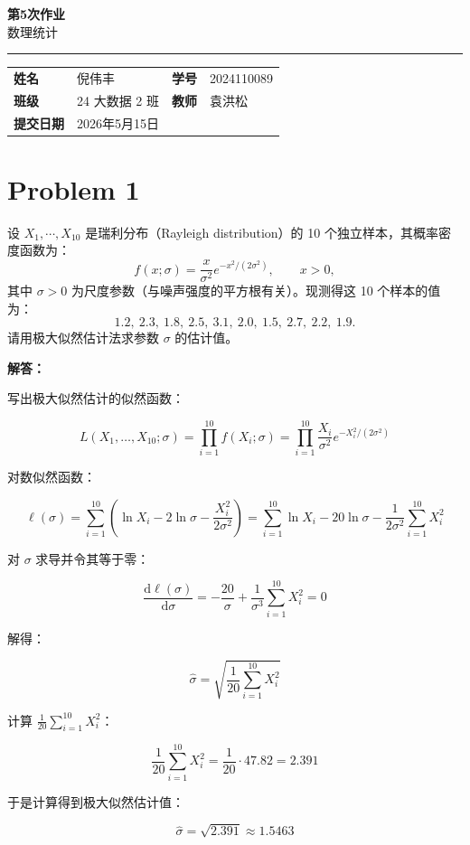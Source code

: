 \documentclass[12pt,a4paper]{article}
\newcommand{\course}{数理统计}
\newcommand{\homeworktitle}{第5次作业}
\newcommand{\studentname}{倪伟丰}
\newcommand{\studentid}{2024110089}
\newcommand{\classname}{24 大数据 2 班}
\newcommand{\teacher}{袁洪松}
\newcommand{\duedate}{2026年5月15日}
\begin{document}
\begin{center}
  {\Huge\bfseries\color{mainblue}\homeworktitle}\\[0.6em]
  {\Large\course}\\[1.2em]
  {\color{linegray}\rule{0.9\textwidth}{0.8pt}}
\end{center}

\begin{infobox}
\begin{tabularx}{\textwidth}{>{\bfseries}p{2.2cm} X >{\bfseries}p{2.2cm} X}
姓名 & \studentname & 学号 & \studentid \\
班级 & \classname & 教师 & \teacher \\
提交日期 & \duedate &  &  \\
\end{tabularx}
\end{infobox}


\section{Problem 1}

设 $X_1,\cdots,X_{10}$ 是瑞利分布（Rayleigh distribution）的 10 个独立样本，其概率密度函数为：
\[
  f(x;\sigma)=\frac{x}{\sigma^2}e^{-x^2/(2\sigma^2)},\qquad x>0,
\]
其中 $\sigma>0$ 为尺度参数（与噪声强度的平方根有关）。现测得这 10 个样本的值为：
\[
  1.2,\ 2.3,\ 1.8,\ 2.5,\ 3.1,\ 2.0,\ 1.5,\ 2.7,\ 2.2,\ 1.9.
\]
请用极大似然估计法求参数 $\sigma$ 的估计值。

\begin{answerbox}
\textbf{解答：}

写出极大似然估计的似然函数：

$$
L(X_1, \ldots, X_{10}; \sigma) = \prod_{i=1}^{10} f(X_i; \sigma) = \prod_{i=1}^{10} \frac{X_i}{\sigma^2} e^{-X_i^2/(2\sigma^2)}
$$

对数似然函数：

$$
\ell(\sigma) = \sum_{i=1}^{10} \left( \ln X_i - 2\ln \sigma - \frac{X_i^2}{2\sigma^2} \right) = \sum_{i=1}^{10} \ln X_i - 20\ln \sigma - \frac{1}{2\sigma^2} \sum_{i=1}^{10} X_i^2
$$

对 $\sigma$ 求导并令其等于零：

$$
\frac{\text{d}\ell(\sigma)}{\text{d}\sigma} = -\frac{20}{\sigma} + \frac{1}{\sigma^3} \sum_{i=1}^{10} X_i^2 = 0
$$

解得：

$$
\hat{\sigma} = \sqrt{\frac{1}{20} \sum_{i=1}^{10} X_i^2}
$$

计算 $\frac{1}{20} \sum_{i=1}^{10} X_i^2$：

$$
\frac{1}{20} \sum_{i=1}^{10} X_i^2 = \frac{1}{20} \cdot 47.82 = 2.391
$$

于是计算得到极大似然估计值：

$$
\hat{\sigma} = \sqrt{2.391} \approx 1.5463
$$

\end{answerbox}
\end{document}
